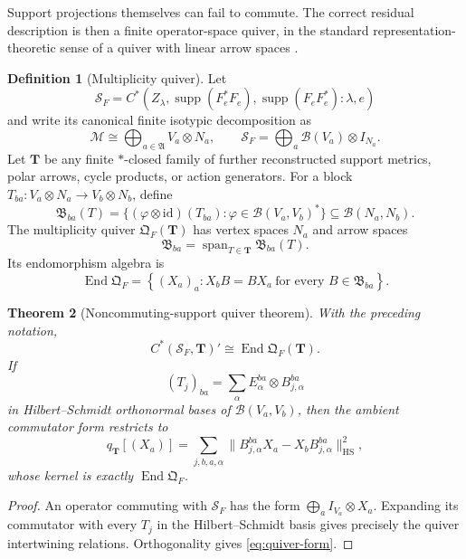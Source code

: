 \documentclass[11pt]{article}
\newtheorem{theorem}{Theorem}[section]
\theoremstyle{definition}
\newtheorem{definition}[theorem]{Definition}
\theoremstyle{remark}
\newcommand{\id}{\mathrm{id}}
\newcommand{\Span}{\operatorname{span}}
\newcommand{\End}{\operatorname{End}}
\newcommand{\supp}{\operatorname{supp}}
\newcommand{\HS}{\mathrm{HS}}
\newcommand{\norm}[1]{\lVert#1\rVert}
\begin{document}
Support projections themselves can fail to commute.  The correct residual
description is then a finite operator-space quiver, in the standard
representation-theoretic sense of a quiver with linear arrow spaces
\cite{Schiffler2014}.

\begin{definition}[Multiplicity quiver]
\label{def:multiplicity-quiver}
Let
\[
\mathcal S_F
=
C^*(Z_\lambda,\supp(F_e^*F_e),\supp(F_eF_e^*):\lambda,e)
\]
and write its canonical finite isotypic decomposition as
\[
\mathscr M
\cong
\bigoplus_{a\in\mathfrak A}V_a\otimes N_a,
\qquad
\mathcal S_F
=
\bigoplus_a\mathcal B(V_a)\otimes I_{N_a}.
\]
Let $\bm T$ be any finite $*$-closed family of further reconstructed support
metrics, polar arrows, cycle products, or action generators.  For a block
$T_{ba}:V_a\otimes N_a\to V_b\otimes N_b$, define
\[
\mathfrak B_{ba}(T)
=
\{(\varphi\otimes\id)(T_{ba}):
\varphi\in\mathcal B(V_a,V_b)^*\}
\subseteq\mathcal B(N_a,N_b).
\]
The multiplicity quiver $\mathfrak Q_F(\bm T)$ has vertex spaces $N_a$ and
arrow spaces
\[
\mathfrak B_{ba}
=
\Span_{T\in\bm T}\mathfrak B_{ba}(T).
\]
Its endomorphism algebra is
\[
\End\mathfrak Q_F
=
\left\{(X_a)_a:
X_bB=BX_a
\ \text{for every }B\in\mathfrak B_{ba}\right\}.
\]
\end{definition}

\begin{theorem}[Noncommuting-support quiver theorem]
\label{thm:quiver}
With the preceding notation,
\begin{equation}
\boxed{
C^*(\mathcal S_F,\bm T)'
\cong
\End\mathfrak Q_F(\bm T).}
\label{eq:quiver-commutant}
\end{equation}
If
\[
(T_j)_{ba}
=
\sum_\alpha E_\alpha^{ba}\otimes B_{j,\alpha}^{ba}
\]
in Hilbert--Schmidt orthonormal bases of
$\mathcal B(V_a,V_b)$, then the ambient commutator form restricts to
\begin{equation}
\boxed{
q_{\bm T}[(X_a)]
=
\sum_{j,b,a,\alpha}
\norm{B_{j,\alpha}^{ba}X_a-X_bB_{j,\alpha}^{ba}}_{\HS}^2,}
\label{eq:quiver-form}
\end{equation}
whose kernel is exactly $\End\mathfrak Q_F$.
\end{theorem}

\begin{proof}
An operator commuting with $\mathcal S_F$ has the form
$\bigoplus_a I_{V_a}\otimes X_a$.  Expanding its commutator with every
$T_j$ in the Hilbert--Schmidt basis gives precisely the quiver intertwining
relations.  Orthogonality gives \eqref{eq:quiver-form}.
\end{proof}
\end{document}
